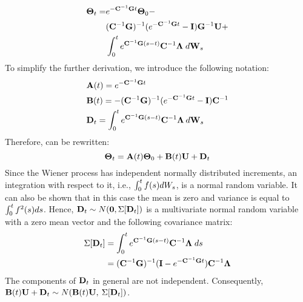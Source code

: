 \begin{align} \equlabel{solution-full}
  \vtemperature_\time = & \emcgt \vtemperature_0 - \\
    & (\cg)^{-1}(\emcgt - \mone) \mconductance^{-1} \vpower + \nonumber \\
    & \int_0^\time \ecg{}{(s - \time)} \mcapacitance^{-1} \mnoisedeviation \; d\m{W}_s \nonumber
\end{align}
To simplify the further derivation, we introduce the following notation:
\begin{align}
  & \m{A}(\time) = \emcg{\time} \equlabel{a} \\
  & \m{B}(\time) = -(\cg)^{-1}(\emcg{\time} - \mone) \mcapacitance^{-1} \equlabel{b} \\
  & \v{D}_\time = \int_0^{\time} \ecg{}{(s - \time)} \mcapacitance^{-1} \mnoisedeviation \: d\m{W}_s \equlabel{d}
\end{align}
Therefore,  can be rewritten:
\[
  \mathbf{\Theta}_t = \mathbf{A}(t) \mathbf{\Theta}_0 + \mathbf{B}(t) \mathbf{U} + \mathbf{D}_t
\]
Since the Wiener process has independent normally distributed increments, an integration with respect to it, i.e., $\int_0^t f(s) dW_s$, is a normal random variable. It can also be shown that in this case the mean is zero and variance is equal to $\int_0^t f^2(s) ds$. Hence, $\mathbf{D}_t \sim N(\mathbf{0}, \Sigma[\mathbf{D}_t])$ is a multivariate normal random variable with a zero mean vector and the following covariance matrix:
\begin{align}
  \covariance{\v{D}_\time} & = \int_0^\time \ecg{}{(s - \time)} \mcapacitance^{-1} \mnoisedeviation \; ds \nonumber \\
    & = (\cg)^{-1} (\mone - \emcgt) \mcapacitance^{-1} \mnoisedeviation \equlabel{covariance-d}
\end{align}
The components of $\mathbf{D}_t$ in general are not independent. Consequently, $\mathbf{B}(t) \mathbf{U} + \mathbf{D}_t \sim N(\mathbf{B}(t) \mathbf{U}, \: \Sigma[\mathbf{D}_t])$.

